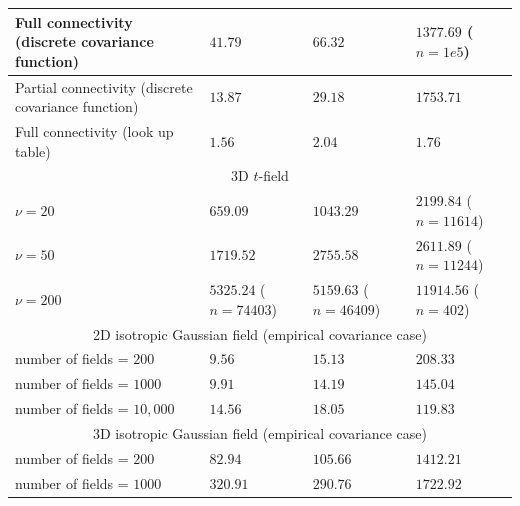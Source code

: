 \documentclass{article}
\begin{document}
\begin{table}[!htp]
\begin{center}
\begin{tabular}{|l|l|l|l|}
Full connectivity (discrete covariance function)    & $41.79$                   & $66.32$                  & $1377.69$ ($n = 1e5$)       \\ \hline
Partial connectivity (discrete covariance function) & $13.87$                   & $29.18$                  & $1753.71$                 \\ \hline
Full connectivity (look up table)                   & $1.56$                    & $2.04$                   & $1.76$                    \\ \hline
\multicolumn{4}{|c|}{3D $t$-field}                                                                                                 \\ \hline
$\nu = 20$                                          & $659.09$                  & $1043.29$                & $2199.84$ ($n = 11614$)     \\ \hline
$\nu = 50$                                          & $1719.52$                 & $2755.58$                & $2611.89$ ($n = 11244$)     \\ \hline
$\nu = 200$                                         & $5325.24$ ($n = 74403$)     & $5159.63$ ($n = 46409$)    & $11914.56$ ($n = 402$)      \\ \hline
\multicolumn{4}{|c|}{2D isotropic Gaussian field (empirical covariance case)}                                                    \\ \hline
number of fields = $200$                               & $9.56$                    & $15.13$                  & $208.33$                  \\ \hline
number of fields = $1000$                              & $9.91$                    & $14.19$                  & $145.04$                  \\ \hline
number of fields = $10{,}000$                             & $14.56$                   & $18.05$                  & $119.83$                  \\ \hline
\multicolumn{4}{|c|}{3D isotropic Gaussian field (empirical covariance case)}                                                    \\ \hline
number of fields = $200$                               & $82.94$                    & $105.66$                  & $1412.21$                  \\ \hline
number of fields = $1000$                              & $320.91$                    & $290.76$                  & $1722.92$                  \\ \hline
\end{tabular}
\end{center}
\end{table}
\end{document}
